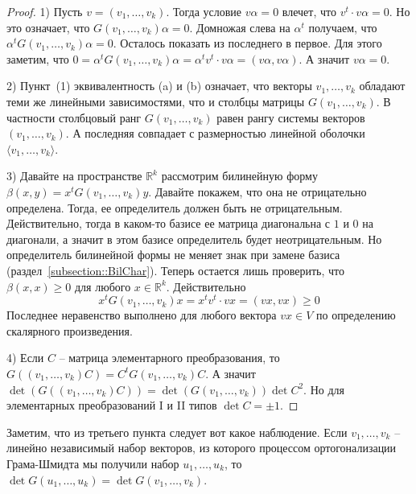 \begin{proof}
1) Пусть $v = (v_1,\ldots,v_k)$.
Тогда условие $v\alpha = 0$ влечет, что $v^t \cdot v\alpha = 0$.
Но это означает, что $G(v_1,\ldots,v_k) \alpha = 0$.
Домножая слева на $\alpha^t$ получаем, что $\alpha^t G(v_1,\ldots,v_k) \alpha = 0$.
Осталось показать из последнего в первое.
Для этого заметим, что $0 = \alpha^t G(v_1,\ldots,v_k) \alpha = \alpha^t v^t \cdot v\alpha = (v\alpha, v\alpha)$.
А значит $v\alpha = 0$.

2) Пункт~(1) эквивалентность (a) и (b) означает, что векторы $v_1,\ldots,v_k$ обладают теми же линейными зависимостями, что и столбцы матрицы $G(v_1,\ldots,v_k)$.
В частности столбцовый ранг $G(v_1,\ldots,v_k)$ равен рангу системы векторов $(v_1,\ldots,v_k)$.
А последняя совпадает с размерностью линейной оболочки $\langle v_1,\ldots,v_k\rangle$.

3) Давайте на пространстве $\mathbb R^k$ рассмотрим билинейную форму $\beta(x,y) = x^t G(v_1,\ldots,v_k)y$.
Давайте покажем, что она не отрицательно определена.
Тогда, ее определитель должен быть не отрицательным.
Действительно, тогда в каком-то базисе ее матрица диагональна с $1$ и $0$ на диагонали, а значит в этом базисе определитель будет неотрицательным.
Но определитель билинейной формы не меняет знак при замене базиса (раздел~\ref{subsection::BilChar}).
Теперь остается лишь проверить, что $\beta(x,x)\geqslant 0$ для любого $x\in \mathbb R^k$.
Действительно
\[
x^t G(v_1,\ldots,v_k) x = x^t v^t\cdot v x = (vx, vx) \geqslant 0
\]
Последнее неравенство выполнено для любого вектора $vx\in V$ по определению скалярного произведения.

4) Если $C$ -- матрица элементарного преобразования, то $G((v_1,\ldots,v_k)C) = C^t G(v_1,\ldots,v_k)C$.
А значит $\det(G((v_1,\ldots,v_k)C)) = \det(G(v_1,\ldots,v_k))\det C^2$.
Но для элементарных преобразований I и II типов $\det C = \pm 1$.
\end{proof}

Заметим, что из третьего пункта следует вот какое наблюдение.
Если $v_1,\ldots, v_k$ -- линейно независимый набор векторов, из которого процессом ортогонализации Грама-Шмидта мы получили набор $u_1,\ldots,u_k$, то $\det G(u_1,\ldots,u_k) = \det G(v_1,\ldots,v_k)$.


